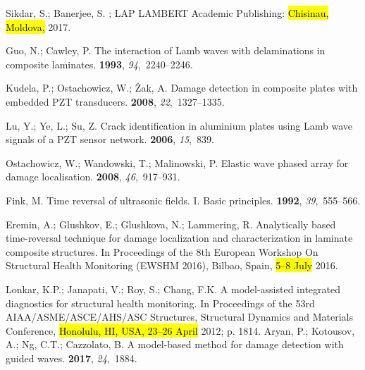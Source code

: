 \documentclass[sensors,article,accept,moreauthors,pdftex]{Definitions/mdpi}
\begin{document}
\begin{thebibliography}{999}
Sikdar, S.; Banerjee, S.
; LAP LAMBERT Academic
  Publishing: \hl{Chisinau, Moldova,} 2017.%

Guo, N.; Cawley, P.
\newblock The interaction of {Lamb} waves with delaminations in composite
  laminates.
 {\bf 1993}, {\em 94},~2240--2246.

Kudela, P.; Ostachowicz, W.; {\.Z}ak, A.
\newblock Damage detection in composite plates with embedded PZT transducers.
 {\bf 2008}, {\em 22},~1327--1335.

Lu, Y.; Ye, L.; Su, Z.
\newblock Crack identification in aluminium plates using Lamb wave signals of a
  {PZT} sensor network.
 {\bf 2006}, {\em 15},~839.

Ostachowicz, W.; Wandowski, T.; Malinowski, P.
\newblock Elastic wave phased array for damage localisation.
 {\bf 2008}, {\em 46},~917--931.

Fink, M.
\newblock Time reversal of ultrasonic fields. I. Basic principles.
 {\bf 1992}, {\em 39},~555--566.

Eremin, A.; Glushkov, E.; Glushkova, N.; Lammering, R.
\newblock Analytically based time-reversal technique for damage localization
  and characterization in laminate composite structures.
\newblock  In Proceedings of the 8th European Workshop On Structural Health Monitoring
  (EWSHM 2016), Bilbao, Spain, \hl{5--8 July} 2016.%

Lonkar, K.P.; Janapati, V.; Roy, S.; Chang, F.K.
\newblock A model-assisted integrated diagnostics for structural health
  monitoring.
\newblock In Proceedings of the 53rd AIAA/ASME/ASCE/AHS/ASC Structures, Structural Dynamics and
  Materials Conference, \hl{Honolulu, HI, USA, 23--26 April} 2012; p. 1814.%
Aryan, P.; Kotousov, A.; Ng, C.T.; Cazzolato, B.
\newblock A model‐based method for damage detection with guided waves.
 {\bf 2017}, {\em 24},~1884.


\end{thebibliography}
\end{document}
